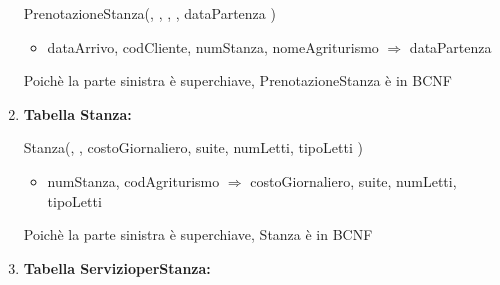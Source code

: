 \documentclass[12pt,a4paper]{article}
\begin{document}
\begin{enumerate}
PrenotazioneStanza(\underline{}, \underline{}, \underline{}, \underline{}, dataPartenza )
\begin{itemize}
\vspace{-5pt}
\item dataArrivo, codCliente, numStanza, nomeAgriturismo $\Rightarrow$ dataPartenza
\vspace{-5pt}
\end{itemize}
Poichè la parte sinistra è superchiave, PrenotazioneStanza è in BCNF
\vspace{10pt}



\item[] \textbf{Tabella Stanza:}

Stanza(\underline{}, \underline{}, costoGiornaliero, suite, numLetti, tipoLetti )
\begin{itemize}
\vspace{-5pt}
\item numStanza, codAgriturismo $\Rightarrow$ costoGiornaliero, suite, numLetti, tipoLetti
\vspace{-5pt}
\end{itemize}
Poichè la parte sinistra è superchiave, Stanza è in BCNF
\vspace{10pt}



\item[] \textbf{Tabella ServizioperStanza:}


\end{enumerate}
\end{document}
